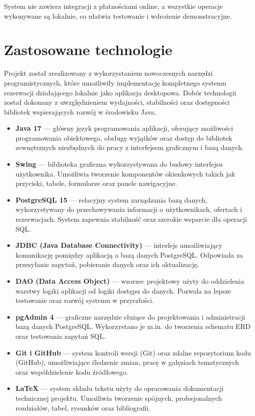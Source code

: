 System nie zawiera integracji z płatnościami online, a wszystkie operacje wykonywane są lokalnie, co ułatwia testowanie i wdrożenie demonstracyjne.


\section{Zastosowane technologie}

Projekt został zrealizowany z wykorzystaniem nowoczesnych narzędzi programistycznych, które umożliwiły implementację kompletnego systemu rezerwacji działającego lokalnie jako aplikacja desktopowa. Dobór technologii został dokonany z uwzględnieniem wydajności, stabilności oraz dostępności bibliotek wspierających rozwój w środowisku Java.

\begin{itemize}
    \item \textbf{Java 17} — główny język programowania aplikacji, oferujący możliwości programowania obiektowego, obsługę wyjątków oraz dostęp do bibliotek zewnętrznych niezbędnych do pracy z interfejsem graficznym i bazą danych.
    
    \item \textbf{Swing} — biblioteka graficzna wykorzystywana do budowy interfejsu użytkownika. Umożliwia tworzenie komponentów okienkowych takich jak przyciski, tabele, formularze oraz panele nawigacyjne.
    
    \item \textbf{PostgreSQL 15} — relacyjny system zarządzania bazą danych, wykorzystywany do przechowywania informacji o użytkownikach, ofertach i rezerwacjach. System zapewnia stabilność oraz szerokie wsparcie dla operacji SQL.
    
    \item \textbf{JDBC (Java Database Connectivity)} — interfejs umożliwiający komunikację pomiędzy aplikacją a bazą danych PostgreSQL. Odpowiada za przesyłanie zapytań, pobieranie danych oraz ich aktualizację.
    
    \item \textbf{DAO (Data Access Object)} — wzorzec projektowy użyty do oddzielenia warstwy logiki aplikacji od logiki dostępu do danych. Pozwala na lepsze testowanie oraz rozwój systemu w przyszłości.
    
    \item \textbf{pgAdmin 4} — graficzne narzędzie służące do projektowania i administracji bazą danych PostgreSQL. Wykorzystano je m.in. do tworzenia schematu ERD oraz testowania zapytań SQL.
    
    \item \textbf{Git i GitHub} — system kontroli wersji (Git) oraz zdalne repozytorium kodu (GitHub), umożliwiające śledzenie zmian, pracę w gałęziach tematycznych oraz współdzielenie kodu źródłowego.
    
    \item \textbf{\LaTeX{}} — system składu tekstu użyty do opracowania dokumentacji technicznej projektu. Umożliwia tworzenie spójnych, profesjonalnych rozdziałów, tabel, rysunków oraz bibliografii.
\end{itemize}

